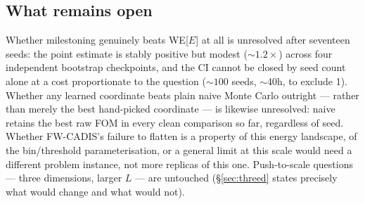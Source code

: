 \documentclass[11pt,a4paper]{article}
\begin{document}
\subsection{What remains open}
Whether milestoning genuinely beats WE[$E$] at all is unresolved after seventeen seeds: the point
estimate is stably positive but modest ($\sim\!1.2\times$) across four independent bootstrap
checkpoints, and the CI cannot be closed by seed count alone at a cost proportionate to the
question ($\sim\!100$ seeds, $\sim$40h, to exclude 1). Whether any learned coordinate beats plain
naive Monte Carlo outright --- rather than merely the best hand-picked coordinate --- is likewise
unresolved: naive retains the best raw FOM in every clean comparison so far, regardless of seed.
Whether FW-CADIS's failure to flatten is a property of this energy landscape, of the
bin/threshold parameterisation, or a general limit at this scale would need a different problem
instance, not more replicas of this one. Push-to-scale questions --- three dimensions, larger $L$
--- are untouched (\S\ref{sec:threed} states precisely what would change and what would not).
\end{document}
